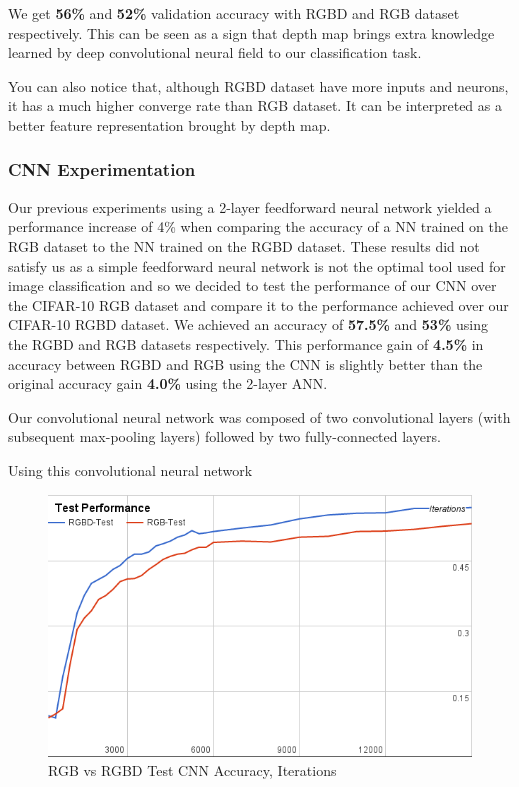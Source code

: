 \documentclass[10pt,twocolumn,letterpaper]{article}
\begin{document}
We get {\bf56\%} and {\bf52\%} validation accuracy with RGBD and RGB dataset respectively.
This can be seen as a sign that depth map brings extra knowledge
 learned by deep convolutional neural field to our classification task.

You can also notice that, although RGBD dataset have more inputs and neurons,
  it has a much higher converge rate than RGB dataset. 
 It can be interpreted as a better feature representation brought by depth map.

\subsubsection{CNN Experimentation}
Our previous experiments using a 2-layer feedforward neural network yielded a performance increase of 4\% when comparing the accuracy of a NN trained on the RGB dataset to the NN trained on the RGBD dataset. These results did not satisfy us as a simple feedforward neural network is not the optimal tool used for image classification and so we decided to test the performance of our CNN  \cite{krizhevsky2012imagenet} over the CIFAR-10 RGB dataset and compare it to the performance achieved over our CIFAR-10 RGBD dataset. We achieved an accuracy of {\bf57.5\%} and {\bf53\%} using the RGBD and RGB datasets respectively. This performance gain of {\bf4.5\%} in accuracy between RGBD and RGB using the CNN is slightly better than the original accuracy gain {\bf4.0\%} using the 2-layer ANN.

Our convolutional neural network was composed of two convolutional layers (with subsequent max-pooling layers) followed by two fully-connected layers. 

Using this convolutional neural network

\begin{figure}
\includegraphics[width=\linewidth]{../presentation/test_conv.png}
\caption{RGB vs RGBD Test CNN Accuracy, Iterations}
\label{fig:mixtest}
\end{figure}
 
\end{document}
